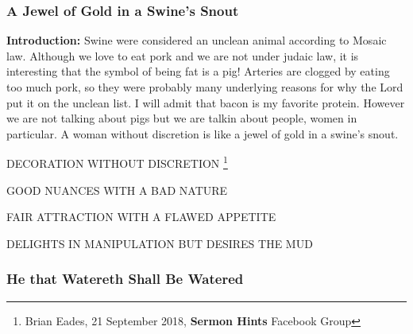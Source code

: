 \subsubsection{A Jewel of Gold in a Swine's Snout}




\textbf{Introduction:} Swine were considered an unclean animal according to Mosaic law. Although we love to eat pork and we are not under judaic law, it is interesting that the symbol of being fat is a pig! Arteries are clogged by eating too much pork, so they were probably many underlying reasons for why the Lord put it on the unclean list. I will admit that bacon is my favorite protein. However we are not talking about pigs but we are talkin about people, women in particular. A woman without discretion is like a jewel of gold in a swine's snout.
\begin{compactenum}[I.]
    \item DECORATION WITHOUT DISCRETION \footnote{Brian Eades, 21 September 2018, \textbf{Sermon Hints} Facebook Group}
    \item GOOD NUANCES WITH A BAD NATURE
    \item FAIR ATTRACTION WITH A FLAWED APPETITE
    \item DELIGHTS IN MANIPULATION BUT DESIRES THE MUD
\end{compactenum}

\subsubsection{He that Watereth Shall Be Watered}




